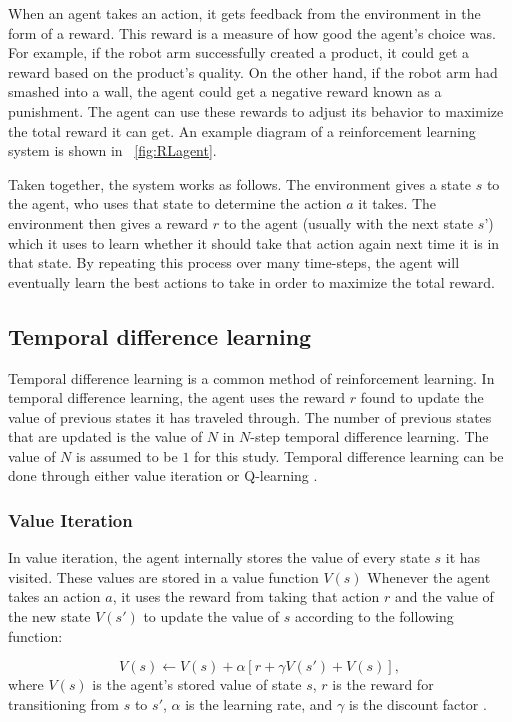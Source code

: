 \documentclass[12pt]{thesis}
\begin{document}
When an agent takes an action, it gets feedback from the environment in the form of a reward. This reward is a measure of how good the agent’s choice was. For example, if the robot arm successfully created a product, it could get a reward based on the product’s quality. On the other hand, if the robot arm had smashed into a wall, the agent could get a negative reward known as a punishment. The agent can use these rewards to adjust its behavior to maximize the total reward it can get. An example diagram of a reinforcement learning system is shown in \figurename~\ref{fig:RLagent}.

Taken together, the system works as follows. The environment gives a state $s$ to the agent, who uses that state to determine the action $a$ it takes. The environment then gives a reward $r$ to the agent (usually with the next state $s’$) which it uses to learn whether it should take that action again next time it is in that state. By repeating this process over many time-steps, the agent will eventually learn the best actions to take in order to maximize the total reward.

\subsection{Temporal difference learning}
Temporal difference learning is a common method of reinforcement learning. In temporal difference learning, the agent uses the reward $r$ found to update the value of previous states it has traveled through. The number of previous states that are updated is the value of $N$ in $N$-step temporal difference learning. The value of $N$ is assumed to be $1$ for this study. Temporal difference learning can be done through either value iteration or Q-learning \cite{Sutton1998}\cite{Ladosz_2022}.
\subsubsection{Value Iteration}
In value iteration, the agent internally stores the value of every state $s$ it has visited. These values are stored in a value function $V(s)$ Whenever the agent takes an action $a$, it uses the reward from taking that action $r$ and the value of the new state $V(s')$ to update the value of $s$ according to the following function:

\begin{equation}
V(s) \leftarrow V(s) + \alpha \left[r + \gamma V(s') + V(s)\right],
\label{TDLVF}
\end{equation}
where $V(s)$ is the agent's stored value of state $s$, $r$ is the reward for transitioning from $s$ to $s'$, $\alpha$ is the learning rate, and $\gamma$ is the discount factor \cite{Sutton1998}.
\end{document}
